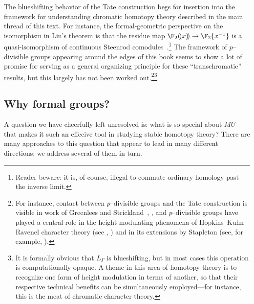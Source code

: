 The blueshifting behavior of the Tate construction begs for insertion into the framework for understanding chromatic homotopy theory described in the main thread of this text.  For instance, the formal-geometric perspective on the isomorphism in Lin's theorem is that the residue map \(\F_2(\!(x)\!) \to \F_2\{x^{-1}\}\) is a quasi-isomorphism of continuous Steenrod comodules~\cite[Remark 8.34]{StricklandFSFG}.\footnote{Reader beware: it is, of course, illegal to commute ordinary homology past the inverse limit.}  The framework of \(p\)--divisible groups appearing around the edges of this book seems to show a lot of promise for serving as a general organizing principle for these ``transchromatic'' results, but this largely has not been worked out.\footnote{For instance, contact between \(p\)--divisible groups and the Tate construction is visible in work of Greenlees and Strickland~\cite{GreenleesStrickland}, \cite[pg.\ 10]{StricklandFPFP}, and \(p\)--divisible groups have played a central role in the height-modulating phenomena of Hopkins--Kuhn--Ravenel character theory (see , \cite{HKR}) and in its extensions by Stapleton (see, for example, \cite{Stapleton,StapletonTwisted}).}\footnote{It is formally obvious that \(L_\Gamma\) is blueshifting, but in most cases this operation is computationally opaque.  A theme in this area of homotopy theory is to recognize one form of height modulation in terms of another, so that their respective technical benefits can be simultaneously employed---for instance, this is the meat of chromatic character theory.}






\subsection*{Why formal groups?}

A question we have cheerfully left unresolved is: what is so special about \(MU\) that makes it such an effecive tool in studying stable homotopy theory?  There are many approaches to this question that appear to lead in many different directions; we address several of them in turn.

